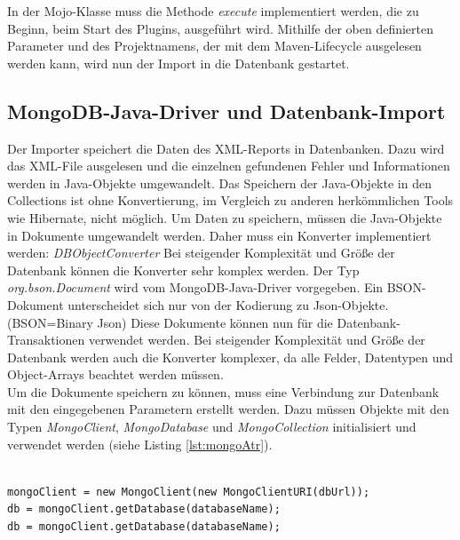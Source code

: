 
In der Mojo-Klasse muss die Methode \textit{execute} implementiert werden, die zu Beginn, beim Start des Plugins, ausgeführt wird. Mithilfe der oben definierten Parameter und des Projektnamens, der mit dem Maven-Lifecycle ausgelesen werden kann, wird nun der Import in die Datenbank gestartet. 

\subsection{MongoDB-Java-Driver und Datenbank-Import}
Der Importer speichert die Daten des XML-Reports in Datenbanken. Dazu wird das XML-File ausgelesen und die einzelnen gefundenen Fehler und Informationen werden in Java-Objekte umgewandelt. Das Speichern der Java-Objekte in den Collections ist ohne Konvertierung, im Vergleich zu anderen herkömmlichen Tools wie Hibernate, nicht möglich. Um Daten zu speichern, müssen die Java-Objekte in Dokumente umgewandelt werden. Daher muss ein Konverter implementiert werden: \textit{DBObjectConverter}
Bei steigender Komplexität und Größe der Datenbank können die Konverter sehr komplex werden. Der Typ \textit{org.bson.Document} wird vom MongoDB-Java-Driver vorgegeben. Ein BSON-Dokument unterscheidet sich nur von der Kodierung zu Json-Objekte. (BSON=Binary Json) 
Diese Dokumente können nun für die Datenbank-Transaktionen verwendet werden. Bei steigender Komplexität und Größe der Datenbank werden auch die Konverter komplexer, da alle Felder, Datentypen und Object-Arrays beachtet werden müssen.
 \\

Um die Dokumente speichern zu können, muss eine Verbindung zur Datenbank mit den eingegebenen Parametern erstellt werden. Dazu müssen Objekte mit den Typen \textit{MongoClient}, \textit{MongoDatabase} und \textit{MongoCollection} initialisiert und verwendet werden (siehe Listing \ref{lst:mongoAtr}).

\lstset{
  caption={Benötigte Attribute, um sich mit der Datenbank verbinden und die Collections verwenden.}, 
  basicstyle=\small\ttfamily, 
  label=lst:mongoAtr, 
  language=Java,
  frame=single,
  breaklines=true, %
  postbreak=\mbox{\textcolor{red}{$\hookrightarrow$}\space},
}

\begin{samepage}%
	\begin{lstlisting}[float=tbhp]
	
mongoClient = new MongoClient(new MongoClientURI(dbUrl));
db = mongoClient.getDatabase(databaseName);
db = mongoClient.getDatabase(databaseName);

	\end{lstlisting}
\end{samepage}

